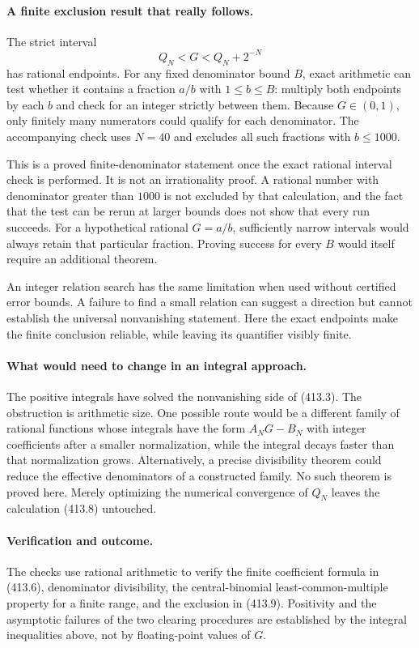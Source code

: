 \documentclass[11pt]{article}
\begin{document}
\paragraph{A finite exclusion result that really follows.}
The strict interval
\[
 Q_N<G<Q_N+2^{-N} \tag{413.9}
\]
has rational endpoints. For any fixed denominator bound $B$, exact arithmetic can test whether it contains a fraction $a/b$ with $1\le b\le B$: multiply both endpoints by each $b$ and check for an integer strictly between them. Because $G\in(0,1)$, only finitely many numerators could qualify for each denominator. The accompanying check uses $N=40$ and excludes all such fractions with $b\le1000$.

This is a proved finite-denominator statement once the exact rational interval check is performed. It is not an irrationality proof. A rational number with denominator greater than $1000$ is not excluded by that calculation, and the fact that the test can be rerun at larger bounds does not show that every run succeeds. For a hypothetical rational $G=a/b$, sufficiently narrow intervals would always retain that particular fraction. Proving success for every $B$ would itself require an additional theorem.

An integer relation search has the same limitation when used without certified error bounds. A failure to find a small relation can suggest a direction but cannot establish the universal nonvanishing statement. Here the exact endpoints make the finite conclusion reliable, while leaving its quantifier visibly finite.

\paragraph{What would need to change in an integral approach.}
The positive integrals have solved the nonvanishing side of (413.3). The obstruction is arithmetic size. One possible route would be a different family of rational functions whose integrals have the form $A_NG-B_N$ with integer coefficients after a smaller normalization, while the integral decays faster than that normalization grows. Alternatively, a precise divisibility theorem could reduce the effective denominators of a constructed family. No such theorem is proved here. Merely optimizing the numerical convergence of $Q_N$ leaves the calculation (413.8) untouched.

\paragraph{Verification and outcome.}
The checks use rational arithmetic to verify the finite coefficient formula in (413.6), denominator divisibility, the central-binomial least-common-multiple property for a finite range, and the exclusion in (413.9). Positivity and the asymptotic failures of the two clearing procedures are established by the integral inequalities above, not by floating-point values of $G$.
\end{document}
